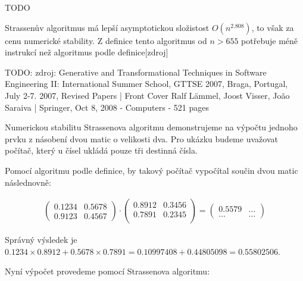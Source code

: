 \documentclass[thesis=B,czech]{FITthesis}[2012/06/26]
\begin{document}
TODO

Strassenův algoritmus má lepší asymptotickou složistost $O(n^{2.808})$, to však za cenu numerické stability. Z definice tento algoritmus od $n > 655$ potřebuje méně instrukcí než algoritmus podle definice[zdroj]

TODO: zdroj: Generative and Transformational Techniques in Software Engineering II: International Summer School, GTTSE 2007, Braga, Portugal, July 2-7. 2007, Revised Papers | Front Cover Ralf Lämmel, Joost Visser, João Saraiva | Springer, Oct 8, 2008 - Computers - 521 pages

Numerickou stabilitu Strassenova algoritmu demonstrujeme na výpočtu jednoho prvku z násobení dvou matic o velikosti dva. Pro ukázku budeme uvažovat počítač, který u čísel ukládá pouze tři destinná čísla.	

Pomocí algoritmu podle definice, by takový počítač vypočítal součin dvou matic následnovně:

\begin{align}
\begin{pmatrix}
 0.1234 & 0.5678 \\
 0.9123 & 0.4567
\end{pmatrix} \cdot \begin{pmatrix}
 0.8912 & 0.3456 \\
 0.7891 & 0.2345 \\
\end{pmatrix} = \begin{pmatrix}
 0.5579 & \hdots \\
 \hdots & \hdots
\end{pmatrix}
\end{align}

Správný výsledek je $0.1234 \times 0.8912 + 0.5678 \times 0.7891 = 0.10997408 + 0.44805098 = 0.55802506$.

Nyní výpočet provedeme pomocí Strassenova algoritmu:
\end{document}
